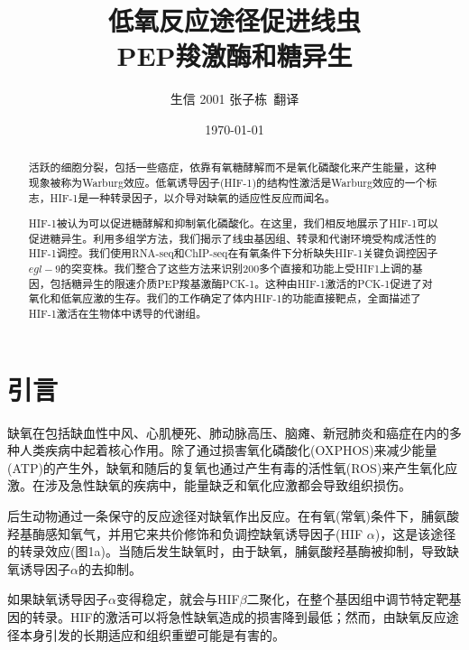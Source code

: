 \documentclass{ctexart}
\title{低氧反应途径促进线虫\\PEP羧激酶和糖异生}
\author{生信 2001 张子栋\ 翻译}
\date{\today}
\begin{document}
    \thispagestyle{empty}
    \maketitle

    \clearpage

    \thispagestyle{empty}

    \begin{abstract}

        活跃的细胞分裂，包括一些癌症，依靠有氧糖酵解而不是氧化磷酸化来产生能量，这种现象被称为Warburg效应。低氧诱导因子(HIF-1)的结构性激活是Warburg效应的一个标志，HIF-1是一种转录因子，以介导对缺氧的适应性反应而闻名。

        HIF-1被认为可以促进糖酵解和抑制氧化磷酸化。在这里，我们相反地展示了HIF-1可以促进糖异生。利用多组学方法，我们揭示了线虫基因组、转录和代谢环境受构成活性的HIF-1调控。我们使用RNA-seq和ChIP-seq在有氧条件下分析缺失HIF-1关键负调控因子$egl-9$的突变株。我们整合了这些方法来识别200多个直接和功能上受HIF1上调的基因，包括糖异生的限速介质PEP羧基激酶PCK-1。这种由HIF-1激活的PCK-1促进了对氧化和低氧应激的生存。我们的工作确定了体内HIF-1的功能直接靶点，全面描述了HIF-1激活在生物体中诱导的代谢组。

    \end{abstract}

    \clearpage

    \tableofcontents
    
    \setcounter{page}{0}

    \thispagestyle{empty}

    \clearpage

    \section{引言}

        缺氧在包括缺血性中风、心肌梗死、肺动脉高压、脑瘫、新冠肺炎和癌症在内的多种人类疾病中起着核心作用。除了通过损害氧化磷酸化(OXPHOS)来减少能量(ATP)的产生外，缺氧和随后的复氧也通过产生有毒的活性氧(ROS)来产生氧化应激。在涉及急性缺氧的疾病中，能量缺乏和氧化应激都会导致组织损伤。

        后生动物通过一条保守的反应途径对缺氧作出反应。在有氧(常氧)条件下，脯氨酸羟基酶感知氧气，并用它来共价修饰和负调控缺氧诱导因子(HIF $\alpha$)，这是该途径的转录效应(图1a)。当随后发生缺氧时，由于缺氧，脯氨酸羟基酶被抑制，导致缺氧诱导因子$\alpha$的去抑制。

        如果缺氧诱导因子$\alpha$变得稳定，就会与HIF$\beta$二聚化，在整个基因组中调节特定靶基因的转录。HIF的激活可以将急性缺氧造成的损害降到最低；然而，由缺氧反应途径本身引发的长期适应和组织重塑可能是有害的。
\end{document}
